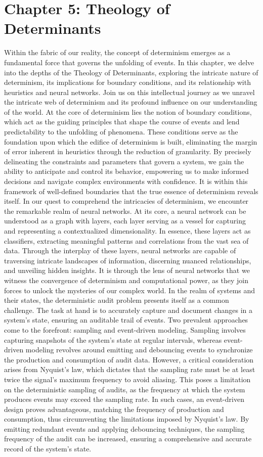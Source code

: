 \documentclass[ebook,12pt,oneside,openany]{memoir}
\begin{document}
\chapter*{Chapter 5: Theology of Determinants}
Within the fabric of our reality, the concept of determinism emerges as a fundamental force that governs the unfolding of events. In this chapter, we delve into the depths of the Theology of Determinants, exploring the intricate nature of determinism, its implications for boundary conditions, and its relationship with heuristics and neural networks. Join us on this intellectual journey as we unravel the intricate web of determinism and its profound influence on our understanding of the world.
At the core of determinism lies the notion of boundary conditions, which act as the guiding principles that shape the course of events and lend predictability to the unfolding of phenomena. These conditions serve as the foundation upon which the edifice of determinism is built, eliminating the margin of error inherent in heuristics through the reduction of granularity. By precisely delineating the constraints and parameters that govern a system, we gain the ability to anticipate and control its behavior, empowering us to make informed decisions and navigate complex environments with confidence. It is within this framework of well-defined boundaries that the true essence of determinism reveals itself.
In our quest to comprehend the intricacies of determinism, we encounter the remarkable realm of neural networks. At its core, a neural network can be understood as a graph with layers, each layer serving as a vessel for capturing and representing a contextualized dimensionality. In essence, these layers act as classifiers, extracting meaningful patterns and correlations from the vast sea of data. Through the interplay of these layers, neural networks are capable of traversing intricate landscapes of information, discerning nuanced relationships, and unveiling hidden insights. It is through the lens of neural networks that we witness the convergence of determinism and computational power, as they join forces to unlock the mysteries of our complex world.
In the realm of systems and their states, the deterministic audit problem presents itself as a common challenge. The task at hand is to accurately capture and document changes in a system's state, ensuring an auditable trail of events. Two prevalent approaches come to the forefront: sampling and event-driven modeling. Sampling involves capturing snapshots of the system's state at regular intervals, whereas event-driven modeling revolves around emitting and debouncing events to synchronize the production and consumption of audit data.
However, a critical consideration arises from Nyquist's law, which dictates that the sampling rate must be at least twice the signal's maximum frequency to avoid aliasing. This poses a limitation on the deterministic sampling of audits, as the frequency at which the system produces events may exceed the sampling rate. In such cases, an event-driven design proves advantageous, matching the frequency of production and consumption, thus circumventing the limitations imposed by Nyquist's law. By emitting redundant events and applying debouncing techniques, the sampling frequency of the audit can be increased, ensuring a comprehensive and accurate record of the system's state.
\end{document}
